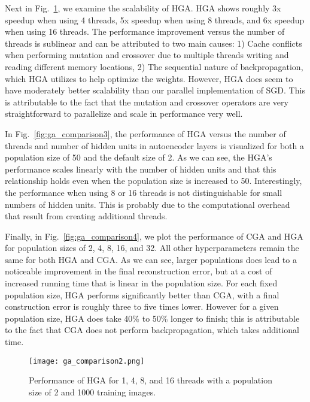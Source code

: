 Next in Fig.~\ref{fig:ga_comparison2}, we examine the scalability of HGA. HGA shows roughly 3x speedup when using 4 threads, 5x speedup when using 8 threads, and 6x speedup when using 16 threads. The performance improvement versus the number of threads is sublinear and can be attributed to two main causes: 1) Cache conflicts when performing mutation and crossover due to multiple threads writing and reading different memory locations, 2) The sequential nature of backpropagation, which HGA utilizes to help optimize the weights. However, HGA does seem to have moderately better scalability than our parallel implementation of SGD. This is attributable to the fact that the mutation and crossover operators are very straightforward to parallelize and scale in performance very well. 

In Fig.~\ref{fig:ga_comparison3}, the performance of HGA versus the number of threads and number of hidden units in autoencoder layers is visualized for both a population size of 50 and the default size of 2. As we can see, the HGA's performance scales linearly with the number of hidden units and that this relationship holds even when the population size is increased to 50. Interestingly, the performance when using 8 or 16 threads is not distinguishable for small numbers of hidden units. This is probably due to the computational overhead that result from creating additional threads.

Finally, in Fig.~\ref{fig:ga_comparison4}, we plot the performance of CGA and HGA for population sizes of 2, 4, 8, 16, and 32. All other hyperparameters remain the same for both HGA and CGA. As we can see, larger populations does lead to a noticeable improvement in the final reconstruction error, but at a cost of increased running time that is linear in the population size. For each fixed population size, HGA performs significantly better than CGA, with a final construction error is roughly three to five times lower. However for a given population size, HGA does take 40\% to 50\% longer to finish; this is attributable to the fact that CGA does not perform backpropagation, which takes additional time. 

\begin{figure}[h] \centering
  \texttt{[image: ga\_comparison2.png]}
  \caption{Performance of HGA for 1, 4, 8, and 16 threads with a population size of 2 and 1000 training images.}
  \label{fig:ga_comparison2}
\end{figure}

\begin{figure*}[h]
  \centering
  \caption{Comparison of performance versus number of threads and number of hidden units in autoencoder layer for HGA with population size (a) 2 and (b) 50.}
  \label{fig:ga_comparison3}
\end{figure*}

